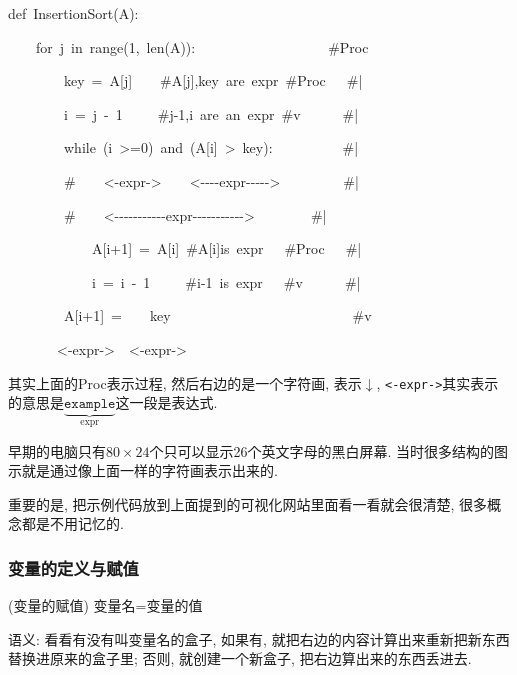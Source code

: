 \begin{lyxcode}
def~InsertionSort(A):~~~~~~~~~~~~~~~~~~~~~~~~~~~~

~~~~for~j~in~range(1,~len(A)):~~~~~~~~~~~~~~~~~~~\#Proc

~~~~~~~~key~=~A{[}j{]}~~~~\#A{[}j{]},key~are~expr~\#Proc~~~\#|

~~~~~~~~i~=~j~-~1~~~~~\#j-1,i~are~an~expr~\#v~~~~~~\#|

~~~~~~~~while~(i~>=0)~and~(A{[}i{]}~>~key):~~~~~~~~~~\#|~~~

~~~~~~~~\#~~~~<-expr->~~~~<-{}-{}-{}-expr-{}-{}-{}-{}->~~~~~~~~~\#|~~~

~~~~~~~~\#~~~~<-{}-{}-{}-{}-{}-{}-{}-{}-{}-{}-expr-{}-{}-{}-{}-{}-{}-{}-{}-{}-{}->~~~~~~~~\#|~~~

~~~~~~~~~~~~A{[}i+1{]}~=~A{[}i{]}~\#A{[}i{]}is~expr~~~\#Proc~~~\#|

~~~~~~~~~~~~i~=~i~-~1~~~~~\#i-1~is~expr~~~\#v~~~~~~\#|

~~~~~~~~A{[}i+1{]}~=~~~~key~~~~~~~~~~~~~~~~~~~~~~~~~~\#v

~~~~~~~<-expr->~~<-expr->
\end{lyxcode}
其实上面的Proc表示过程, 然后右边的是一个字符画, 表示$\downarrow$, \texttt{<-expr->}其实表示的意思是$\underbrace{\texttt{example}}_{\text{expr}}$这一段是表达式. 

\begin{idea}
	早期的电脑只有$80\times 24$个只可以显示26个英文字母的黑白屏幕. 当时很多结构的图示就是通过像上面一样的字符画表示出来的. 
\end{idea}

重要的是, 把示例代码放到上面提到的可视化网站里面看一看就会很清楚, 很多概念都是不用记忆的. 

\subsubsection{变量的定义与赋值}
\begin{definition}
(变量的赋值) 变量名=变量的值
\end{definition}
语义: 看看有没有叫变量名的盒子, 如果有, 就把右边的内容计算出来重新把新东西替换进原来的盒子里; 否则, 就创建一个新盒子, 把右边算出来的东西丢进去. 

